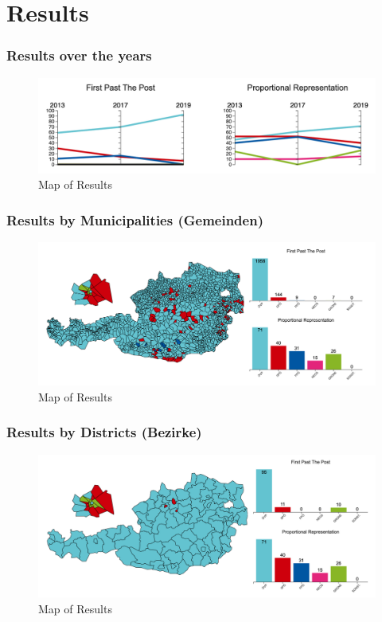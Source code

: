 \documentclass{beamer}
\begin{document}
\section{Results} 

\begin{frame}
\frametitle{Results over the years}
\begin{figure}[h]
  \centering
  \includegraphics[width=0.9\linewidth]{images/paralellCoordinates.png} %
  \caption{\label{fig:mapOfResults} Map of Results}
\end{figure}
\end{frame}


\begin{frame}
\frametitle{Results by Municipalities (Gemeinden)}
\begin{figure}[h]
  \centering
  \includegraphics[width=0.9\linewidth]{images/mapbyGemeinden.png} %
  \caption{\label{fig:mapOfResults} Map of Results}
\end{figure}
\end{frame}

\begin{frame}
\frametitle{Results by Districts (Bezirke)}
\begin{figure}[h]
  \centering
  \includegraphics[width=0.9\linewidth]{images/mapbyBezirken.png}
  \caption{\label{fig:mapOfResults} Map of Results}
\end{figure}
\end{frame}
\end{document}
